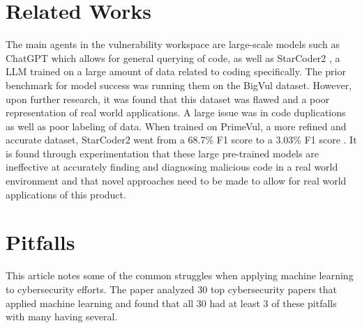 \documentclass{article}
\begin{document}
\section{Related Works}
The main agents in the vulnerability workspace are large-scale models such as ChatGPT \cite{openai2024gpt4} which allows for general querying of code, as well as StarCoder2 \cite{lozhkov2024starcoder2stackv2}, a LLM trained on a large amount of data related to coding specifically. The prior benchmark for model success was running them on the BigVul dataset. However, upon further research, it was found that this dataset was flawed and a poor representation of real world applications. A large issue was in code duplications as well as poor labeling of data. When trained on PrimeVul, a more refined and accurate dataset, StarCoder2 went from a 68.7\% F1 score to a 3.03\% F1 score \cite{ding2024vulnerabilitydetectioncodelanguage}. It is found through experimentation that these large pre-trained models are ineffective at accurately finding and diagnosing malicious code in a real world environment and that novel approaches need to be made to allow for real world applications of this product. \cite{ding2024vulnerabilitydetectioncodelanguage}

\section{Pitfalls}

This article notes some of the common struggles when applying machine learning to cybersecurity efforts. The paper analyzed 30 top cybersecurity papers that applied machine learning and found that all 30 had at least 3 of these pitfalls with many having several.
\end{document}
